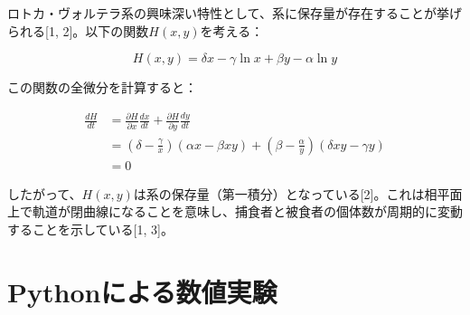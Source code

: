 \documentclass{article}
\begin{document}
ロトカ・ヴォルテラ系の興味深い特性として、系に保存量が存在することが挙げられる[1, 2]。以下の関数$H(x,y)$を考える：

\begin{equation}
H(x,y) = \delta x - \gamma \ln x + \beta y - \alpha \ln y
\end{equation}

この関数の全微分を計算すると：

\begin{align}
\frac{dH}{dt} &= \frac{\partial H}{\partial x}\frac{dx}{dt} + \frac{\partial H}{\partial y}\frac{dy}{dt} \\
&= \left(\delta - \frac{\gamma}{x}\right)(\alpha x - \beta xy) + \left(\beta - \frac{\alpha}{y}\right)(\delta xy - \gamma y) \\
&= 0
\end{align}

したがって、$H(x,y)$は系の保存量（第一積分）となっている[2]。これは相平面上で軌道が閉曲線になることを意味し、捕食者と被食者の個体数が周期的に変動することを示している[1, 3]。

\section{Pythonによる数値実験}
\end{document}
